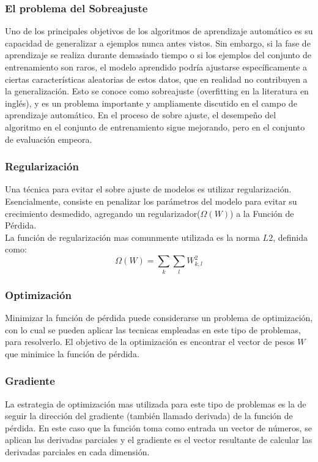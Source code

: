 \documentclass[a4paper,11pt,spanish]{book}
\begin{document}
	\subsubsection {El problema del Sobreajuste}
	  Uno de los principales objetivos de los algoritmos de aprendizaje automático es su capacidad de generalizar a ejemplos nunca antes vistos. Sin embargo, si la fase
	  de aprendizaje se realiza durante demasiado tiempo o si los ejemplos del conjunto de entrenamiento son raros, el modelo aprendido podría ajustarse específicamente
	  a ciertas características aleatorias de estos datos, que en realidad no contribuyen a la generalización. Esto se conoce como sobreajuste (overfitting en la literatura en inglés),
	  y es un problema importante y ampliamente discutido en el campo de aprendizaje automático. En el proceso de sobre ajuste, el desempeño del algoritmo en el
	  conjunto de entrenamiento sigue mejorando, pero en el conjunto de evaluación empeora.

	\subsubsection {Regularización}
	  Una técnica para evitar el sobre ajuste de modelos es utilizar regularización. Esencialmente, consiste en penalizar los parámetros del modelo para evitar su
	  crecimiento desmedido, agregando un regularizador($\Omega(W)$) a la Función de Pérdida. \\
	  La función de regularización mas comunmente utilizada es la norma $L2$, definida como:
	   \begin{equation}
	    \Omega(W) = {\sum_{k} {\sum_{l}} W_{k,l}^2}
	   \end{equation}

    \subsubsection{Optimización}
      Minimizar la función de pérdida puede considerarse un problema de optimización, con lo cual se pueden aplicar las tecnicas empleadas en este tipo de problemas, para resolverlo.
      El objetivo de la optimización es encontrar el vector de pesos $W$ que minimice la función de pérdida.

    \subsubsection{Gradiente}
      La estrategia de optimización mas utilizada para este tipo de problemas es la de seguir la dirección del gradiente (también llamado derivada) de la función de pérdida.
      En este caso que la función toma como entrada un vector de números, se aplican las derivadas parciales y el gradiente es el vector resultante de calcular las derivadas parciales
      en cada dimensión.
\end{document}
